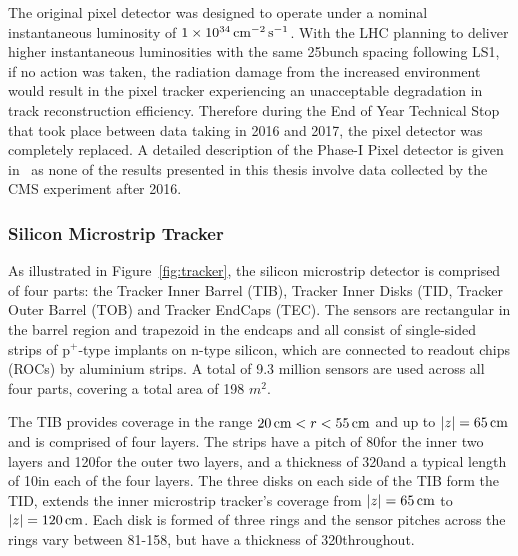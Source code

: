 The original pixel detector was designed to operate under a nominal instantaneous luminosity of $1 \times 10^{34}\,\text{cm}^\text{$-$2}\,\text{s}^\text{$-$1}$.
With the LHC planning to deliver higher instantaneous luminosities with the same 25\ns bunch spacing following LS1, if no action was taken, the radiation damage from the increased \PU environment would result in the pixel tracker experiencing an unacceptable degradation in track reconstruction efficiency.
Therefore during the End of Year Technical Stop that took place between data taking in 2016 and 2017, the pixel detector was completely replaced.
A detailed description of the Phase-I Pixel detector is given in~\cite{CMS:2012sda} as none of the results presented in this thesis involve data collected by the CMS experiment after 2016.


\subsubsection{Silicon Microstrip Tracker}
As illustrated in Figure~\ref{fig:tracker}, the silicon microstrip detector is comprised of four parts: the Tracker Inner Barrel (TIB), Tracker Inner Disks (TID, Tracker Outer Barrel (TOB) and Tracker EndCaps (TEC).
The sensors are rectangular in the barrel region and trapezoid in the endcaps and all consist of single-sided strips of p$^{+}$-type implants on n-type silicon, which are connected to readout chips (ROCs) by aluminium strips.
A total of 9.3 million sensors are used across all four parts, covering a total area of 198 $\unit{m}^{2}$.

The TIB provides coverage in the range $20\,\text{cm} < r < 55\,\text{cm}$ and up to $|z| = 65\,\text{cm}$ and is comprised of four layers.
The strips have a pitch of 80\mum for the inner two layers and 120\mum for the outer two layers, and a thickness of 320\mum and a typical length of 10\cm in each of the four layers.
The three disks on each side of the TIB form the TID, extends the inner microstrip tracker's coverage from $|z| = 65\,\text{cm}$ to $|z| = 120\,\text{cm}$.
Each disk is formed of three rings and the sensor pitches across the rings vary between 81-158\mum, but have a thickness of 320\mum throughout.

